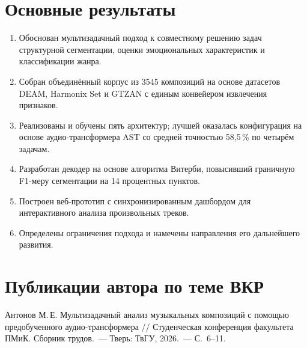 \documentclass[master,summary]{pmk-graduate}
\begin{document}
\section{Основные результаты}

\begin{enumerate}
\item Обоснован мультизадачный подход к совместному решению задач структурной
сегментации, оценки эмоциональных характеристик и классификации жанра.
\item Собран объединённый корпус из 3545 композиций на основе датасетов DEAM,
Harmonix Set и GTZAN с единым конвейером извлечения признаков.
\item Реализованы и обучены пять архитектур; лучшей оказалась конфигурация на
основе аудио-трансформера AST со средней точностью 58,5\,\% по четырём задачам.
\item Разработан декодер на основе алгоритма Витерби, повысивший граничную
F1-меру сегментации на 14 процентных пунктов.
\item Построен веб-прототип с синхронизированным дашбордом для интерактивного
анализа произвольных треков.
\item Определены ограничения подхода и намечены направления его дальнейшего
развития.
\end{enumerate}

\section{Публикации автора по теме ВКР}

Антонов М.\,Е. Мультизадачный анализ музыкальных композиций с помощью
предобученного аудио-трансформера // Студенческая конференция факультета
ПМиК. Сборник трудов.~--- Тверь: ТвГУ, 2026.~--- С.~6--11.
\end{document}
